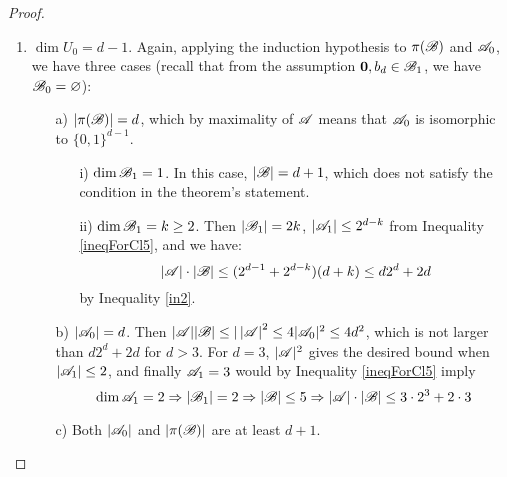 \begin{proof}
\begin{enumerate}
\begin{enumerate}
\begin{equation*}
                \left|\aaa\right|\cdot\left|\bb\right| \leq 4\cdot\left(d-2\right)\left(2^{d-2}+2\right)+2 \cdot 2^d - 2\left|\aaa_0\right| = 2d(2^{d-1}+1)+2\left(3d-8-\left|\aaa_0\right|\right)
            \end{equation*}
            This completes the proof when $\left|\aaa_0\right|\geq3d-8$. Otherwise,
            \begin{equation*}
                \left|\aaa\right|\cdot\left|\bb\right| \leq \left|\aaa\right|^2 \leq 4\left|\aaa_0\right|^2 \leq 4\left(3d-9\right)^2,
            \end{equation*}
            which is less than $d2^d+2d$ for $d\geq3$. 
        \end{enumerate}
        \item $\operatorname{dim}U_0 = d-1$. Again, applying the induction hypothesis to $\pi({\mathscr{B}})$ and ${\mathscr{A}}_0$, we have three cases (recall that from the assumption $\mathbf{0},b_d\in{\mathscr{B}}_1$, we have ${\mathscr{B}}_0=\varnothing$):
        \begin{enumerate}
            \item[a)] $|\pi({\mathscr{B}})|=d$, which by maximality of ${\mathscr{A}}$ means that ${\mathscr{A}}_0$ is isomorphic to $\{0,1\}^{d-1}$.
            \begin{enumerate}
                \item[i)] $\operatorname{dim}{\mathscr{B}}_1=1$. In this case, $\left|{\mathscr{B}}\right|=d+1$, which does not satisfy the condition in the theorem's statement.
                \item[ii)] $\operatorname{dim}{\mathscr{B}}_1=k\geq2$. Then $\left|{\mathscr{B}}_1\right|=2k$, $\left|{\mathscr{A}}_1\right|\leq2^{d-k}$ from Inequality \ref{ineqForCl5}, and we have:
                \begin{equation*}
                    \left|{\mathscr{A}}\right|\cdot\left|{\mathscr{B}}\right|\leq(2^{d-1}+2^{d-k})(d+k) \leq d2^d+2d
                \end{equation*}
                by Inequality \ref{in2}.
            \end{enumerate}
            \item[b)] $\left|{\mathscr{A}}_0\right|=d$. Then $|{\mathscr{A}}||{\mathscr{B}}|\leq|\left|{\mathscr{A}}\right|^2\leq4|{\mathscr{A}}_0|^2\leq4d^2$, which is not larger than $d2^d+2d$ for $d>3$. For $d=3$, $|{\mathscr{A}}|^2$ gives the desired bound when $|{\mathscr{A}}_1|\leq2$, and finally ${\mathscr{A}}_1=3$ would by Inequality \ref{ineqForCl5} imply 
            \[
                \operatorname{dim}{\mathscr{A}}_1=2 \Rightarrow |{\mathscr{B}}_1|=2 \Rightarrow |{\mathscr{B}}|\leq 5 \Rightarrow |{\mathscr{A}}|\cdot|{\mathscr{B}}|\leq 3\cdot 2^3 + 2\cdot 3
            \]
            \item[c)] Both $\left|{\mathscr{A}}_0\right|$ and $\left|\pi({\mathscr{B}})\right|$ are at least $d+1$.

\end{enumerate}
\end{enumerate}
\end{proof}
